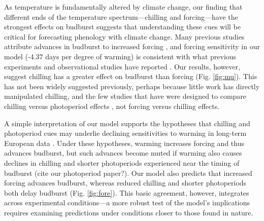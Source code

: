 \documentclass{article}
\begin{document}
\par As temperature is fundamentally altered by climate change, our finding that different ends of the temperature spectrum---chilling and forcing---have the strongest effects on budburst suggests that understanding these cues will be critical for forecasting phenology with climate change. Many previous studies attribute advances in budburst to increased forcing \citep{Basler:2014aa,bradley1999,menzel2006,harrington2015}, and forcing sensitivity in our model (-4.37 days per degree of warming) is consistent with what previous experiments and observational studies have reported \citep{Wolkovich:2012n,menzel2006}. Our results, however, suggest chilling has a greater effect on budburst than forcing (Fig. \ref{fig:mu}). This has not been widely suggested previously, perhaps because little work has directly manipulated chilling, and the few studies that have were designed to compare chilling versus photoperiod effects \citep[e.g., ][]{Basler:2014aa,Caffarra:2011qf,Laube:2014a,zohner2016}, not forcing versus chilling effects. 

\par A simple interpretation of our model supports the hypotheses that chilling and photoperiod cues may underlie declining sensitivities to warming in long-term European data \citep{Rutishauser:2008,yu2010,fu2015}. Under these hypotheses, warming increases forcing and thus advances budburst, but such advances become muted if warming also causes declines in chilling and shorter photoperiods experienced near the timing of budburst (cite our photoperiod paper?)\citep{koerner2010a}. Our model also predicts that increased forcing advances budburst, whereas reduced chilling and shorter photoperiods both delay budburst (Fig. \ref{fig:fore}). This basic agreement, however, integrates across experimental conditions---a more robust test of the model's implications requires examining predictions under conditions closer to those found in nature.
\end{document}
